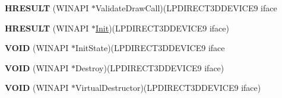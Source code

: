 \begin{DoxyCompactItemize}
{\bfseries H\+R\+E\+S\+U\+LT} (W\+I\+N\+A\+PI $\ast$Validate\+Draw\+Call)(L\+P\+D\+I\+R\+E\+C\+T3\+D\+D\+E\+V\+I\+C\+E9 iface
\item 
\mbox{\label{struct___i_direct3_d_device9_vtbl___i_n_t_a7b17efc8679d51575be4920639cd4bc3}} 
{\bfseries H\+R\+E\+S\+U\+LT} (W\+I\+N\+A\+PI $\ast$\hyperlink{class_init}{Init})(L\+P\+D\+I\+R\+E\+C\+T3\+D\+D\+E\+V\+I\+C\+E9 iface)
\item 
\mbox{\label{struct___i_direct3_d_device9_vtbl___i_n_t_aedba0f2100934c2ea40279e49731d160}} 
{\bfseries V\+O\+ID} (W\+I\+N\+A\+PI $\ast$Init\+State)(L\+P\+D\+I\+R\+E\+C\+T3\+D\+D\+E\+V\+I\+C\+E9 iface
\item 
\mbox{\label{struct___i_direct3_d_device9_vtbl___i_n_t_a8865507a01aeacdd321e4debdda40a09}} 
{\bfseries V\+O\+ID} (W\+I\+N\+A\+PI $\ast$Destroy)(L\+P\+D\+I\+R\+E\+C\+T3\+D\+D\+E\+V\+I\+C\+E9 iface)
\item 
\mbox{\label{struct___i_direct3_d_device9_vtbl___i_n_t_ab1d2fbaaf99a6fa3af5c0a309d30a70e}} 
{\bfseries V\+O\+ID} (W\+I\+N\+A\+PI $\ast$Virtual\+Destructor)(L\+P\+D\+I\+R\+E\+C\+T3\+D\+D\+E\+V\+I\+C\+E9 iface)
\end{DoxyCompactItemize}

